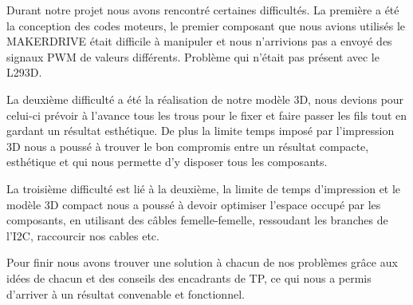Durant notre projet nous avons rencontré certaines difficultés. La première a été la conception des codes moteurs, le premier composant que nous avions utilisés le MAKERDRIVE était difficile à manipuler et nous n'arrivions pas a envoyé des signaux PWM de valeurs différents. Problème qui n'était pas présent avec le L293D.

La deuxième difficulté a été la réalisation de notre modèle 3D, nous devions pour celui-ci prévoir à l'avance tous les trous pour le fixer et faire passer les fils tout en gardant un résultat esthétique. De plus la limite temps imposé par l'impression 3D nous a poussé à trouver le bon compromis entre un résultat compacte, esthétique et qui nous permette d'y disposer tous les composants.

La troisième difficulté est lié à la deuxième, la limite de temps d'impression et le modèle 3D compact nous a poussé à devoir optimiser l'espace occupé par les composants, en utilisant des câbles femelle-femelle, ressoudant les branches de l'I2C, raccourcir nos cables etc.

Pour finir nous avons trouver une solution à chacun de nos problèmes grâce aux idées de chacun et des conseils des encadrants de TP, ce qui nous a permis d'arriver à un résultat convenable et fonctionnel.

\newpage
